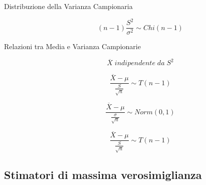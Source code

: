 \begin{description}
	\item[Distribuzione della Varianza Campionaria]
	\begin{equation}
	(n-1)\frac{S^{2}}{\sigma^{2}} \sim Chi(n-1)
	\end{equation}
	
	\item[Relazioni tra Media e Varianza Campionarie]
	\begin{equation}
	\overline{X} \; indipendente \; da \; S^{2}
	\end{equation}
	
	\begin{equation}
	\frac{\overline{X}-\mu}{\frac{S}{\sqrt{n}}} \sim T(n-1)
	\end{equation}
	
	\begin{equation}
	\frac{\overline{X}-\mu}{\frac{\sigma}{\sqrt{n}}} \sim Norm(0,1)
	\end{equation}
	
	\begin{equation}
	\frac{\overline{X}-\mu}{\frac{S}{\sqrt{n}}} \sim T(n-1)
	\end{equation}
	
\end{description}

\subsection{Stimatori di massima verosimiglianza}


